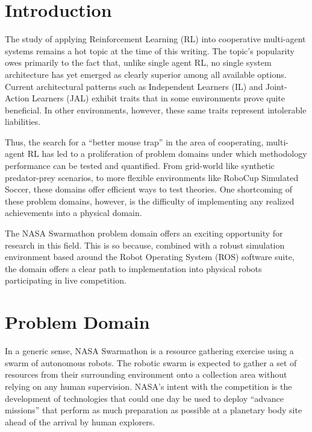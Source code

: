 \documentclass[sigconf,authordraft]{acmart}
\begin{document}
\maketitle

\section{Introduction}\label{sec:intro}
The study of applying Reinforcement Learning (RL) into cooperative multi-agent
systems remains a hot topic at the time of this writing. The topic's popularity
owes primarily to the fact that, unlike single agent RL, no single system
architecture has yet emerged as clearly superior among all available options.
Current architectural patterns such as Independent Learners (IL) and
Joint-Action Learners (JAL) exhibit traits that in some environments prove
quite beneficial. In other environments, however, these same traits represent
intolerable liabilities.

Thus, the search for a ``better mouse trap'' in the area of cooperating,
multi-agent RL has led to a proliferation of problem domains under which
methodology performance can be tested and quantified. From grid-world like
synthetic predator-prey scenarios, to more flexible environments like RoboCup
Simulated Soccer, these domains offer efficient ways to test theories. One
shortcoming of these problem domains, however, is the difficulty of implementing
any realized achievements into a physical domain.

The NASA Swarmathon problem domain offers an exciting opportunity for research
in this field. This is so because, combined with a robust simulation environment
based around the Robot Operating System (ROS) software suite, the domain offers
a clear path to implementation into physical robots participating in live
competition.

\section{Problem Domain}\label{sec:prob_domain}
In a generic sense, NASA Swarmathon is a resource gathering exercise using a
swarm of autonomous robots. The robotic swarm is expected to gather a set of
resources from their surrounding environment onto a collection area without
relying on any human supervision. NASA's intent with the competition is the
development of technologies that could one day be used to deploy ``advance
missions'' that perform as much preparation as possible at a planetary body site ahead of the arrival by human explorers.
\end{document}
